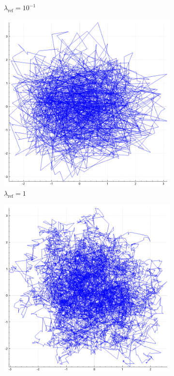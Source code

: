 \documentclass[report.tex]{subfiles}
\begin{document}
\begin{figure}
\begin{subfigure}{.25\textwidth}
    \caption*{$\lambda_{\text{ref}} = 10^{-1}$}
  \end{subfigure}
  \begin{subfigure}{.25\textwidth}
    \includegraphics[width=\textwidth]{img/bps_ref_1}
    \caption*{$\lambda_{\text{ref}} = 1$}
  \end{subfigure}
  \begin{subfigure}{.25\textwidth}
    \includegraphics[width=\textwidth]{img/bps_ref_10}

\end{subfigure}
\end{figure}
\end{document}
